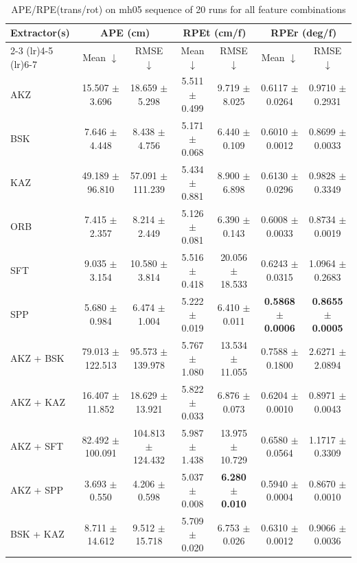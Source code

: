 \begin{table}[hbp]
\centering
\caption{APE/RPE(trans/rot) on mh05 sequence of 20 runs for all feature combinations}
\scriptsize
\label{tab:mh05_ape_rpe}\
\setlength{\tabcolsep}{3pt}
\begin{tabular}{lcccccc}
\toprule
\textbf{Extractor(s)}
& \multicolumn{2}{c}{\textbf{APE (cm)}}
& \multicolumn{2}{c}{\textbf{RPEt (cm/f)}}
& \multicolumn{2}{c}{\textbf{RPEr (deg/f)}} \\
\cmidrule(lr){2-3} \cmidrule(lr){4-5} \cmidrule(lr){6-7}
& Mean $\downarrow$ & RMSE $\downarrow$
& Mean $\downarrow$ & RMSE $\downarrow$
& Mean $\downarrow$ & RMSE $\downarrow$ \\
\midrule
AKZ & 15.507 $\pm$ 3.696 & 18.659 $\pm$ 5.298 & 5.511 $\pm$ 0.499 & 9.719 $\pm$ 8.025 & 0.6117 $\pm$ 0.0264 & 0.9710 $\pm$ 0.2931 \\
BSK & 7.646 $\pm$ 4.448 & 8.438 $\pm$ 4.756 & 5.171 $\pm$ 0.068 & 6.440 $\pm$ 0.109 & 0.6010 $\pm$ 0.0012 & 0.8699 $\pm$ 0.0033 \\
KAZ & 49.189 $\pm$ 96.810 & 57.091 $\pm$ 111.239 & 5.434 $\pm$ 0.881 & 8.900 $\pm$ 6.898 & 0.6130 $\pm$ 0.0296 & 0.9828 $\pm$ 0.3349 \\
ORB & 7.415 $\pm$ 2.357 & 8.214 $\pm$ 2.449 & 5.126 $\pm$ 0.081 & 6.390 $\pm$ 0.143 & 0.6008 $\pm$ 0.0033 & 0.8734 $\pm$ 0.0019 \\
SFT & 9.035 $\pm$ 3.154 & 10.580 $\pm$ 3.814 & 5.516 $\pm$ 0.418 & 20.056 $\pm$ 18.533 & 0.6243 $\pm$ 0.0315 & 1.0964 $\pm$ 0.2683 \\
SPP & 5.680 $\pm$ 0.984 & 6.474 $\pm$ 1.004 & 5.222 $\pm$ 0.019 & 6.410 $\pm$ 0.011 & \textbf{0.5868 $\pm$ 0.0006} & \textbf{0.8655 $\pm$ 0.0005} \\
AKZ + BSK & 79.013 $\pm$ 122.513 & 95.573 $\pm$ 139.978 & 5.767 $\pm$ 1.080 & 13.534 $\pm$ 11.055 & 0.7588 $\pm$ 0.1800 & 2.6271 $\pm$ 2.0894 \\
AKZ + KAZ & 16.407 $\pm$ 11.852 & 18.629 $\pm$ 13.921 & 5.822 $\pm$ 0.033 & 6.876 $\pm$ 0.073 & 0.6204 $\pm$ 0.0010 & 0.8971 $\pm$ 0.0043 \\
AKZ + SFT & 82.492 $\pm$ 100.091 & 104.813 $\pm$ 124.432 & 5.987 $\pm$ 1.438 & 13.975 $\pm$ 10.729 & 0.6580 $\pm$ 0.0564 & 1.1717 $\pm$ 0.3309 \\
AKZ + SPP & 3.693 $\pm$ 0.550 & 4.206 $\pm$ 0.598 & 5.037 $\pm$ 0.008 & \textbf{6.280 $\pm$ 0.010} & 0.5940 $\pm$ 0.0004 & 0.8670 $\pm$ 0.0010 \\
BSK + KAZ & 8.711 $\pm$ 14.612 & 9.512 $\pm$ 15.718 & 5.709 $\pm$ 0.020 & 6.753 $\pm$ 0.026 & 0.6310 $\pm$ 0.0012 & 0.9066 $\pm$ 0.0036 \\

\end{tabular}
\end{table}
